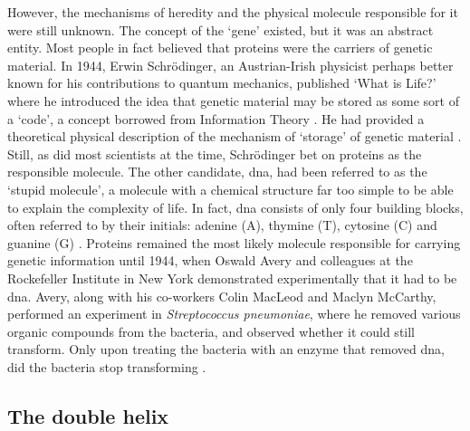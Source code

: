However, the mechanisms of heredity and the physical molecule responsible for it were still unknown. 
The concept of the `gene' existed, but it was an abstract entity. 
Most people in fact believed that proteins were the carriers of genetic material. 
In 1944, Erwin  Schrödinger, an Austrian-Irish physicist perhaps better known for his contributions to quantum mechanics, published `What is Life?' where he introduced the idea that genetic material may be stored as some sort of a `code', a concept borrowed from Information Theory \cite{schrodinger1944what}. 
He had provided a theoretical physical description of the mechanism of `storage' of genetic material \cite{mukherjee2016gene}.
Still, as did most scientists at the time, Schrödinger bet on proteins as the responsible molecule. 
The other candidate, \gls{dna}, had been referred to as the `stupid molecule', a molecule with a chemical structure far too simple to be able to explain the complexity of life. 
In fact, \gls{dna} consists of only four building blocks, often referred to by their initials: adenine (A), thymine (T), cytosine (C) and guanine (G) \cite{alberts2018molecular}.
Proteins remained the most likely molecule responsible for carrying genetic information until 1944, when Oswald Avery and colleagues at the Rockefeller Institute in New York demonstrated experimentally that it had to be \gls{dna}. 
Avery, along with his co-workers Colin MacLeod and Maclyn McCarthy, performed an experiment in \textit{Streptococcus pneumoniae}, where he removed various organic compounds from the bacteria, and observed whether it could still transform. 
Only upon treating the bacteria with an enzyme that removed \gls{dna}, did the bacteria stop transforming \cite{avery1944studies}.


\subsection{The double helix} %
\label{sec:double_helix}

